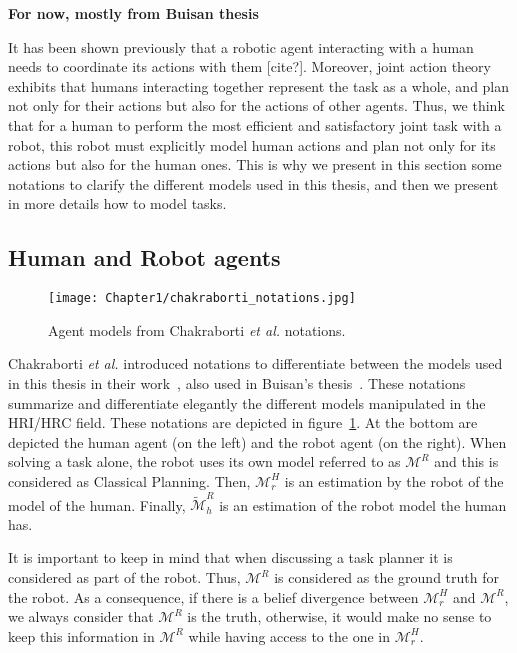 \textbf{For now, mostly from Buisan thesis}



It has been shown previously that a robotic agent interacting with a human needs to coordinate its actions with them [cite?]. Moreover, joint action theory exhibits that humans interacting together represent the task as a whole, and plan not only for their actions but also for the actions of other agents. Thus, we think that for a human to perform the most efficient and satisfactory joint task with a robot, this robot must explicitly model human actions and plan not only for its actions but also for the human ones. This is why we present in this section some notations to clarify the different models used in this thesis, and then we present in more details how to model tasks.

\subsection{Human and Robot agents}

\begin{figure}
    \centering
    \texttt{[image: Chapter1/chakraborti\_notations.jpg]}
    \caption{Agent models from Chakraborti \textit{et al.} notations.}
    \label{fig:chakraborti_notations}
\end{figure}

Chakraborti \textit{et al.} introduced notations to differentiate between the models used in this thesis in their work~\cite{ChakrabortiBTZS15}, also used in Buisan's thesis~\cite{thesisBuisan21}. These notations summarize and differentiate elegantly the different models manipulated in the HRI/HRC field. These notations are depicted in figure~\ref{fig:chakraborti_notations}. At the bottom are depicted the human agent (on the left) and the robot agent (on the right). When solving a task alone, the robot uses its own model referred to as $\mathcal{M}^R$ and this is considered as Classical Planning. 
Then, $\mathcal{M}^H_r$ is an estimation by the robot of the model of the human. Finally, $\tilde{\mathcal{M}}^R_h$ is an estimation of the robot model the human has. 

It is important to keep in mind that when discussing a task planner it is considered as part of the robot. Thus, $\mathcal{M}^R$ is considered as the ground truth for the robot. As a consequence, if there is a belief divergence between $\mathcal{M}^H_r$ and $\mathcal{M}^R$, we always consider that $\mathcal{M}^R$ is the truth, otherwise, it would make no sense to keep this information in $\mathcal{M}^R$ while having access to the one in $\mathcal{M}^H_r$.

